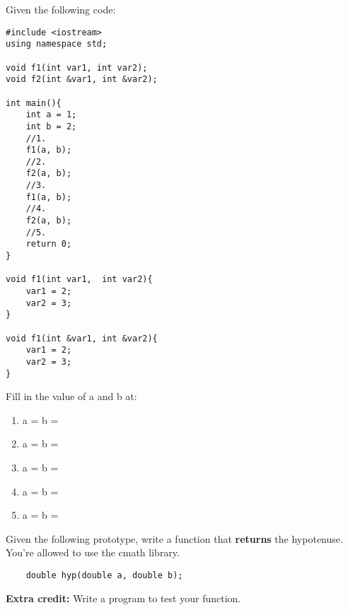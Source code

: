 \documentclass[addpoints,12pt]{exam}
\begin{document}

\begin{center}
\end{center}
\vspace{0.1in}
\begin{center}
\gradetable[h][questions]
\end{center}

\begin{questions}
\question [5] Given the following code:
\begin{multicols}{2}
\begin{lstlisting}
#include <iostream>
using namespace std;

void f1(int var1, int var2);
void f2(int &var1, int &var2);

int main(){
	int a = 1;
	int b = 2;
	//1.
	f1(a, b);
	//2. 
	f2(a, b);
	//3. 
	f1(a, b);
	//4. 
	f2(a, b);
	//5.
	return 0;
}

void f1(int var1,  int var2){
	var1 = 2;
	var2 = 3;
}

void f1(int &var1, int &var2){
	var1 = 2;
	var2 = 3;
}

\end{lstlisting}
\columnbreak
Fill in the value of a and b at:
	\begin{enumerate}
		\item a = \underline{\hspace{1cm}} b = \underline{\hspace{1cm}}    
		\item a = \underline{\hspace{1cm}} b = \underline{\hspace{1cm}}
		\item a = \underline{\hspace{1cm}} b = \underline{\hspace{1cm}}   
		\item a = \underline{\hspace{1cm}} b = \underline{\hspace{1cm}}   
		\item a = \underline{\hspace{1cm}} b = \underline{\hspace{1cm}}   
	\end{enumerate}   
\end{multicols}
\question [5]
Given the following prototype, write a function that \textbf{returns} the hypotenuse. You're allowed to use the cmath library.
\begin{lstlisting}
	double hyp(double a, double b);
\end{lstlisting}
 \textbf{Extra credit:} Write a program to test your function. 
\end{questions}
\end{document}
